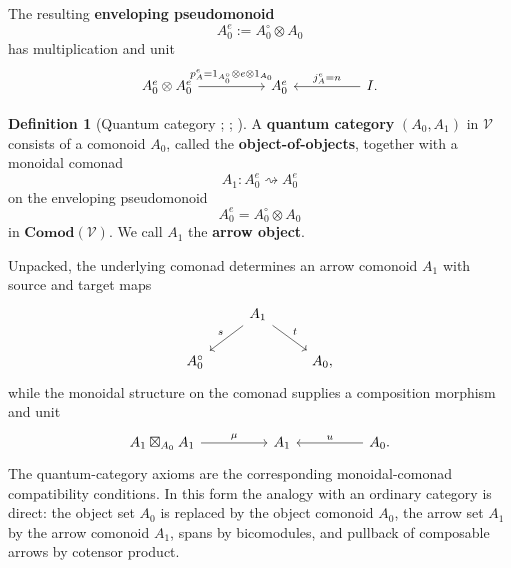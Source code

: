 \documentclass[oneside]{article}
\theoremstyle{plain}
\theoremstyle{definition}
\newtheorem{definition}[theorem]{Definition}
\theoremstyle{remark}
\begin{document}
The resulting \textbf{enveloping pseudomonoid}
\[
    A_0^e:=A_0^\circ\otimes A_0
\]
has multiplication and unit
\begin{equation*}
    \begin{tikzcd}[column sep=huge]
        A_0^e\otimes A_0^e
            \arrow[r,
                "p_A^e=1_{A_0^\circ}\otimes e\otimes1_{A_0}"]
        &
        A_0^e
        &
        I
            \arrow[l,"j_A^e=n"']
        .
    \end{tikzcd}
\end{equation*}

\begin{definition}[Quantum category {\cite[\S12]{DayStreet2004}; \cite[\S5.2]{PastroStreet2009}; \cite[Def.~5.2]{Chikhladze2011QuantumCategories}}]
\label{def:cgqg-background-quantum-category}
    A \textbf{quantum category} \((A_0,A_1)\) in \(\mathcal V\) consists of a comonoid \(A_0\), called the \textbf{object-of-objects}, together with a monoidal comonad
    \[
        A_1:A_0^e\rightsquigarrow{} A_0^e
    \]
    on the enveloping pseudomonoid
    \[
        A_0^e=A_0^\circ\otimes A_0
    \]
    in \(\mathbf{Comod}(\mathcal V)\). We call \(A_1\) the \textbf{arrow object}.
\end{definition}

Unpacked, the underlying comonad determines an arrow comonoid \(A_1\) with source and target maps
\begin{equation*}
    \begin{tikzcd}
        & A_1
            \arrow[dl,"s"']
            \arrow[dr,"t"]
        & \\
        A_0^\circ && A_0,
    \end{tikzcd}
\end{equation*}
while the monoidal structure on the comonad supplies a composition morphism and unit
\begin{equation*}
    \begin{tikzcd}[column sep=huge]
        A_1\boxtimes_{A_0}A_1
            \arrow[r,"\mu"]
        &
        A_1
        &
        A_0
            \arrow[l,"u"']
        .
    \end{tikzcd}
\end{equation*}
The quantum-category axioms are the corresponding monoidal-comonad compatibility conditions. In this form the analogy with an ordinary category is direct: the object set \(A_0\) is replaced by the object comonoid \(A_0\), the arrow set \(A_1\) by the arrow comonoid \(A_1\), spans by bicomodules, and pullback of composable arrows by cotensor product.
\end{document}
